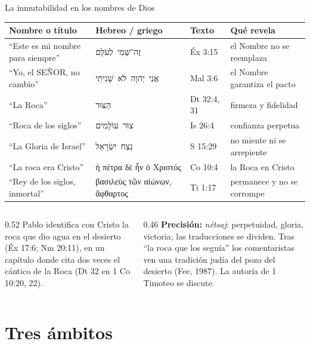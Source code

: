 \documentclass[hyperref={bookmarks=false},aspectratio=169]{beamer}
\newcommand{\heb}[1]{\mbox{\foreignlanguage{hebrew}{#1}}}
\newcommand{\grc}[1]{\foreignlanguage{ancientgreek}{#1}}
\newcommand{\SENOR}{S{\fontsize{0.78em}{1em}\selectfont EÑOR}}
\newcommand{\precision}[1]{{\footnotesize\color{gris}\textbf{Precisión:} #1}}
\begin{document}
\begin{frame}{La inmutabilidad en los nombres de Dios}
\scriptsize\renewcommand{\arraystretch}{1.15}
\begin{tabular}{@{}>{\RaggedRight\arraybackslash}p{3.1cm}>{\RaggedRight\arraybackslash}p{3.5cm}>{\RaggedRight\arraybackslash}p{2.0cm}>{\RaggedRight\arraybackslash}p{3.2cm}@{}}
\toprule
\textbf{Nombre o título} & \textbf{Hebreo / griego} & \textbf{Texto} & \textbf{Qué revela} \\ \midrule
``Este es mi nombre para siempre'' & \heb{זֶה־שְּׁמִי לְעֹלָם} & Éx 3:15 & el Nombre no se reemplaza \\
``Yo, el \SENOR, no cambio'' & \heb{אֲנִי יְהוָה לֹא שָׁנִיתִי} & Mal 3:6 & el Nombre garantiza el pacto \\
``La Roca'' & \heb{הַצּוּר} & Dt 32:4, 31 & firmeza y fidelidad \\
``Roca de los siglos'' & \heb{צוּר עוֹלָמִים} & Is 26:4 & confianza perpetua \\
``La Gloria de Israel'' & \heb{נֵצַח יִשְׂרָאֵל} & 1 S 15:29 & no miente ni se arrepiente \\
``La roca era Cristo'' & \grc{ἡ πέτρα δὲ ἦν ὁ Χριστός} & 1 Co 10:4 & la Roca en Cristo \\
``Rey de los siglos, inmortal'' & \grc{βασιλεὺς τῶν αἰώνων, ἄφθαρτος} & 1 Ti 1:17 & permanece y no se corrompe \\
\bottomrule
\end{tabular}\par\medskip
\begin{columns}[t,onlytextwidth]
\begin{column}{0.52\textwidth}\small
Pablo identifica con Cristo la roca que dio agua en el desierto (Éx 17:6; Nm 20:11), en un capítulo donde cita dos veces el cántico de la Roca (Dt 32 en 1 Co 10:20, 22).
\end{column}
\begin{column}{0.46\textwidth}
\precision{\emph{nétsaj}: perpetuidad, gloria, victoria; las traducciones se dividen. Tras ``la roca que los seguía'' los comentaristas ven una tradición judía del pozo del desierto (Fee, 1987). La autoría de 1 Timoteo se discute.}
\end{column}
\end{columns}
\end{frame}

\section{Tres ámbitos}
\end{document}
